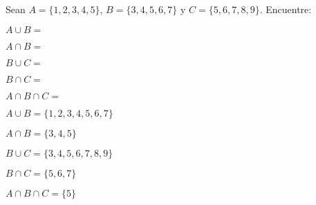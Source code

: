 \begin{exercise}
\problem Sean $A = \{1, 2, 3, 4, 5\}$, $B = \{3, 4, 5, 6, 7\}$ y $C = \{5, 6, 7, 8, 9\}$. Encuentre:

\begin{exerciselist}
    \item $A \cup B = $ \underline{\hspace{5cm}}
    \item $A \cap B = $ \underline{\hspace{5cm}}
    \item $B \cup C = $ \underline{\hspace{5cm}}
    \item $B \cap C = $ \underline{\hspace{5cm}}
    \item $A \cap B \cap C = $ \underline{\hspace{5cm}}
\end{exerciselist}

\begin{solucion}
\begin{exerciselist}
    \item $A \cup B = \{1, 2, 3, 4, 5, 6, 7\}$
    \item $A \cap B = \{3, 4, 5\}$
    \item $B \cup C = \{3, 4, 5, 6, 7, 8, 9\}$
    \item $B \cap C = \{5, 6, 7\}$
    \item $A \cap B \cap C = \{5\}$
\end{exerciselist}
\end{solucion}
\end{exercise}

